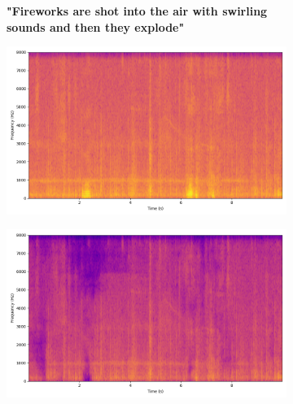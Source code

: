 \begin{figure}[!htbp]
     \begin{subfigure}[b]{0.185\textwidth}
        \centering
        \scriptsize\textbf{"Fireworks are shot into the air with swirling sounds and then they explode"}
        \vspace{5.0mm}
    \end{subfigure}
    \begin{subfigure}[b]{0.185\textwidth}
        \centering
        \includegraphics[width=\textwidth]{plots/onepeace_best_delta_similarity/onepeace mixture_spectrogram.png}
    \end{subfigure}
    \begin{subfigure}[b]{0.185\textwidth}
        \centering
        \includegraphics[width=\textwidth]{plots/onepeace_best_delta_similarity/onepeace sep_spectrogram.png}
    \end{subfigure}
    \begin{subfigure}[b]{0.185\textwidth}
        \centering

\end{subfigure}
\end{figure}
